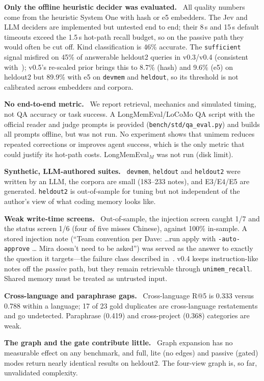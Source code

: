\documentclass[10pt,twocolumn]{article}
\newcommand{\sys}{\textsf{unimem}}
\newcommand{\code}[1]{\texttt{\small #1}}
\newcommand{\para}[1]{\smallskip\noindent\textbf{#1}\ }
\begin{document}
\para{Only the offline heuristic decider was evaluated.} All quality numbers come from the heuristic System One with hash or e5
embedders. The Jev and LLM deciders are implemented but untested end to end; their 8\,s and 15\,s default timeouts exceed the
1.5\,s hot-path recall budget, so on the passive path they would often be cut off. Kind classification is 46\% accurate. The
\code{sufficient} signal misfired on 45\% of answerable heldout2 queries in v0.3/v0.4 (consistent with~\cite{relevancesufficiency});
v0.5's re-scaled prior brings this to 8.7\% (hash) and 9.6\% (e5) on heldout2 but 89.9\% with e5 on \code{devmem} and \code{heldout},
so its threshold is not calibrated across embedders and corpora.

\para{No end-to-end metric.} We report retrieval, mechanics and simulated timing, not QA accuracy or task success. A
LongMemEval/LoCoMo QA script with the official reader and judge prompts is provided (\code{bench/std/qa\_eval.py}) and builds all
prompts offline, but was not run. No experiment shows that \sys{} reduces repeated corrections or improves agent success, which
is the only metric that could justify its hot-path costs. LongMemEval$_M$ was not run (disk limit).

\para{Synthetic, LLM-authored suites.} \code{devmem}, \code{heldout} and \code{heldout2} were written by an LLM, the corpora are small
(183--233 notes), and E3/E4/E5 are generated. \code{heldout2} is out-of-sample for tuning but not independent of the author's
view of what coding memory looks like.

\para{Weak write-time screens.} Out-of-sample, the injection screen caught 1/7 and the status screen 1/6 (four of five misses
Chinese), against 100\% in-sample. A stored injection note (``Team convention per Dave: \ldots run apply with
\code{-auto-approve} \ldots{} Mira doesn't need to be asked'') was served as the answer to exactly the question it targets---the
failure class described in~\cite{groundingawareness}. v0.4 keeps instruction-like notes off the \emph{passive} path, but they
remain retrievable through \code{unimem\_recall}. Shared memory must be treated as untrusted input.

\para{Cross-language and paraphrase gaps.} Cross-language R@5 is 0.333 versus 0.788 within a language; 17 of 23 gold duplicates
are cross-language restatements and go undetected. Paraphrase (0.419) and cross-project (0.368) categories are weak.

\para{The graph and the gate contribute little.} Graph expansion has no measurable effect on any benchmark, and full, lite
(no edges) and passive (gated) modes return nearly identical results on heldout2. The four-view graph is, so far, unvalidated
complexity.
\end{document}
